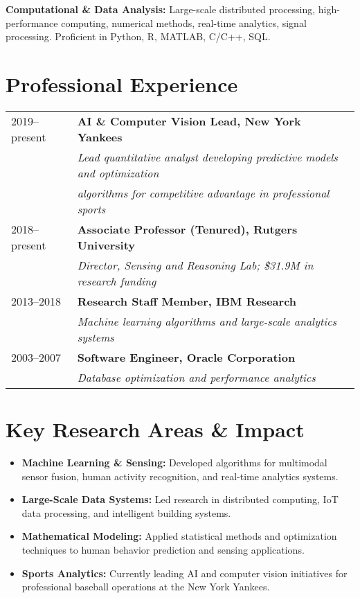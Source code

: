 \documentclass[11pt]{article}
\begin{document}
\textbf{Computational \& Data Analysis:} Large-scale distributed processing, high-performance computing, numerical methods, real-time analytics, signal processing. Proficient in Python, R, MATLAB, C/C++, SQL.

\section{Professional Experience}
\begin{tabular}{l l}
2019--present & \textbf{AI \& Computer Vision Lead, New York Yankees} \\
& \textit{Lead quantitative analyst developing predictive models and optimization} \\
& \textit{algorithms for competitive advantage in professional sports} \\
2018--present & \textbf{Associate Professor (Tenured), Rutgers University} \\
& \textit{Director, Sensing and Reasoning Lab; \$31.9M in research funding} \\
2013--2018 & \textbf{Research Staff Member, IBM Research} \\
& \textit{Machine learning algorithms and large-scale analytics systems} \\
2003--2007 & \textbf{Software Engineer, Oracle Corporation} \\
& \textit{Database optimization and performance analytics} \\
\end{tabular}

\section{Key Research Areas \& Impact}
\begin{itemize}
    \item \textbf{Machine Learning \& Sensing:} Developed algorithms for multimodal sensor fusion, human activity recognition, and real-time analytics systems.
    \item \textbf{Large-Scale Data Systems:} Led research in distributed computing, IoT data processing, and intelligent building systems.
    \item \textbf{Mathematical Modeling:} Applied statistical methods and optimization techniques to human behavior prediction and sensing applications.
    \item \textbf{Sports Analytics:} Currently leading AI and computer vision initiatives for professional baseball operations at the New York Yankees.
\end{itemize}
\end{document}
